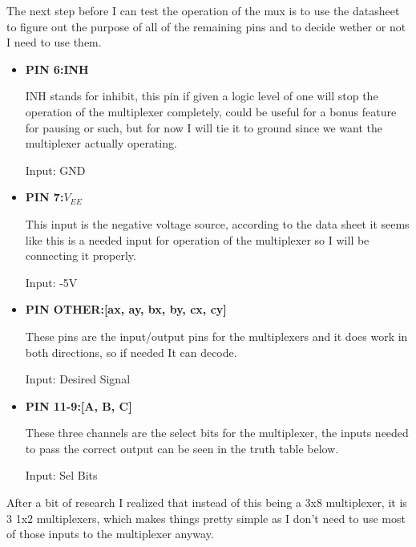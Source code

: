 \documentclass{article}
\begin{document}
The next step before I can test the operation of the mux is to use the datasheet to figure out the purpose of all of the remaining pins and to decide wether or not I need to use them.
\begin{itemize}
    \item \textbf{PIN 6:INH}
    
    INH stands for inhibit, this pin if given a logic level of one will stop the operation of the multiplexer completely, could be useful for a bonus feature for pausing or such, but for now I will tie it to ground since we want the multiplexer actually operating.
    
    Input: GND
    \item \textbf{PIN 7:$V_{EE}$}
    
    This input is the negative voltage source, according to the data sheet it seems like this is a needed input for operation of the multiplexer so I will be connecting it properly.
    
    Input: -5V
    \item \textbf{PIN OTHER:[ax, ay, bx, by, cx, cy]}
    
    These pins are the input/output pins for the multiplexers and it does work in both directions, so if needed It can decode.
    
    Input: Desired Signal
    \item \textbf{PIN 11-9:[A, B, C]}
    
    These three channels are the select bits for the multiplexer, the inputs needed to pass the correct output can be seen in the truth table below.
    
    Input: Sel Bits
\end{itemize}
\begin{center}
\end{center}
After a bit of research I realized that instead of this being a 3x8 multiplexer, it is 3 1x2 multiplexers, which makes things pretty simple as I don't need to use most of those inputs to the multiplexer anyway.
\end{document}
